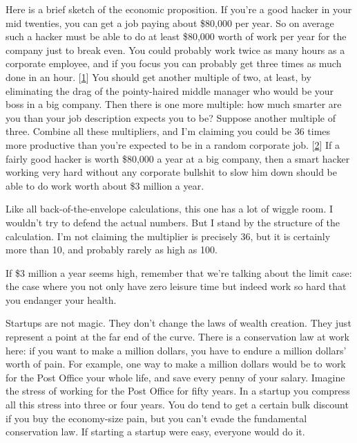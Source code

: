 Here is a brief sketch of the
                    economic proposition. If you're a good hacker in your mid
                    twenties, you can get a job paying about \$80,000 per year.
                    So on average such a hacker must be able to do at least
                    \$80,000 worth of work per year for the company just to break
                    even. You could probably work twice as many hours as a
                    corporate employee, and if you focus you can probably get
                    three times as much done in an hour.
                    [\href{\#f1n}{1}]
                    You should get another multiple of two, at least, by
                    eliminating the drag of the pointy-haired middle manager who
                    would be your boss in a big company. Then there is one more
                    multiple: how much smarter are you than your job description
                    expects you to be? Suppose another multiple of three.
                    Combine all these multipliers, and I'm claiming you could be
                    36 times more productive than you're expected to be in a
                    random corporate job.
                    [\href{\#f2n}{2}]
                    If a fairly good hacker is worth \$80,000 a year at a big
                    company, then a smart hacker working very hard without any
                    corporate bullshit to slow him down should be able to do
                    work worth about \$3 million a year.

Like all
                    back-of-the-envelope calculations, this one has a lot of
                    wiggle room. I wouldn't try to defend the actual numbers.
                    But I stand by the structure of the calculation. I'm not
                    claiming the multiplier is precisely 36, but it is certainly
                    more than 10, and probably rarely as high as 100.

If
                    \$3 million a year seems high, remember that we're talking
                    about the limit case: the case where you not only have zero
                    leisure time but indeed work so hard that you endanger your
                    health.

Startups are not magic. They don't change
                    the laws of wealth creation. They just represent a point at
                    the far end of the curve. There is a conservation law at
                    work here: if you want to make a million dollars, you have
                    to endure a million dollars' worth of pain. For example, one
                    way to make a million dollars would be to work for the Post
                    Office your whole life, and save every penny of your salary.
                    Imagine the stress of working for the Post Office for fifty
                    years. In a startup you compress all this stress into three
                    or four years. You do tend to get a certain bulk discount if
                    you buy the economy-size pain, but you can't evade the
                    fundamental conservation law. If starting a startup were
                    easy, everyone would do it.

